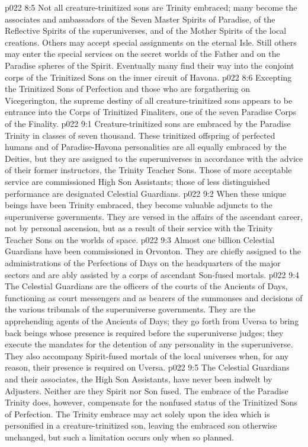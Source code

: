 \vs p022 8:5 Not all creature\hyp{}trinitized sons are Trinity embraced; many become the associates and ambassadors of the Seven Master Spirits of Paradise, of the Reflective Spirits of the superuniverses, and of the Mother Spirits of the local creations. Others may accept special assignments on the eternal Isle. Still others may enter the special services on the secret worlds of the Father and on the Paradise spheres of the Spirit. Eventually many find their way into the conjoint corps of the Trinitized Sons on the inner circuit of Havona.
\vs p022 8:6 Excepting the Trinitized Sons of Perfection and those who are forgathering on Vicegerington, the supreme destiny of all creature\hyp{}trinitized sons appears to be entrance into the Corps of Trinitized Finaliters, one of the seven Paradise Corps of the Finality.
\vs p022 9:1 Creature\hyp{}trinitized sons are embraced by the Paradise Trinity in classes of seven thousand. These trinitized offspring of perfected humans and of Paradise\hyp{}Havona personalities are all equally embraced by the Deities, but they are assigned to the superuniverses in accordance with the advice of their former instructors, the Trinity Teacher Sons. Those of more acceptable service are commissioned High Son Assistants; those of less distinguished performance are designated Celestial Guardians.
\vs p022 9:2 When these unique beings have been Trinity embraced, they become valuable adjuncts to the superuniverse governments. They are versed in the affairs of the ascendant career, not by personal ascension, but as a result of their service with the Trinity Teacher Sons on the worlds of space.
\vs p022 9:3 \pc Almost one billion Celestial Guardians have been commissioned in Orvonton. They are chiefly assigned to the administrations of the Perfections of Days on the headquarters of the major sectors and are ably assisted by a corps of ascendant Son\hyp{}fused mortals.
\vs p022 9:4 The Celestial Guardians are the officers of the courts of the Ancients of Days, functioning as court messengers and as bearers of the summonses and decisions of the various tribunals of the superuniverse governments. They are the apprehending agents of the Ancients of Days; they go forth from Uversa to bring back beings whose presence is required before the superuniverse judges; they execute the mandates for the detention of any personality in the superuniverse. They also accompany Spirit\hyp{}fused mortals of the local universes when, for any reason, their presence is required on Uversa.
\vs p022 9:5 \pc The Celestial Guardians and their associates, the High Son Assistants, have never been indwelt by Adjusters. Neither are they Spirit nor Son fused. The embrace of the Paradise Trinity does, however, compensate for the nonfused status of the Trinitized Sons of Perfection. The Trinity embrace may act solely upon the idea which is personified in a creature\hyp{}trinitized son, leaving the embraced son otherwise unchanged, but such a limitation occurs only when so planned.
